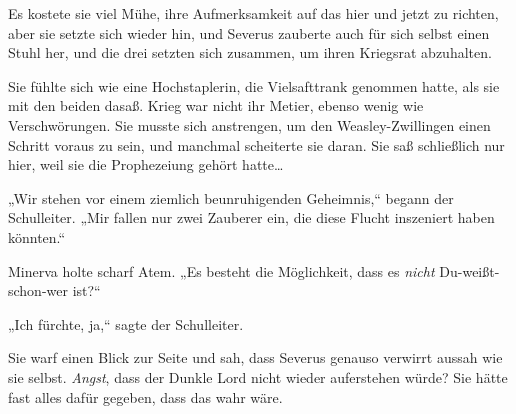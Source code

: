 Es kostete sie viel Mühe, ihre Aufmerksamkeit auf das hier und jetzt zu richten, aber sie setzte sich wieder hin, und Severus zauberte auch für sich selbst einen Stuhl her, und die drei setzten sich zusammen, um ihren Kriegsrat abzuhalten.

Sie fühlte sich wie eine Hochstaplerin, die Vielsafttrank genommen hatte, als sie mit den beiden dasaß. Krieg war nicht ihr Metier, ebenso wenig wie Verschwörungen. Sie musste sich anstrengen, um den Weasley-Zwillingen einen Schritt voraus zu sein, und manchmal scheiterte sie daran. Sie saß schließlich nur hier, weil sie die Prophezeiung gehört hatte…

„Wir stehen vor einem ziemlich beunruhigenden Geheimnis,“ begann der Schulleiter. „Mir fallen nur zwei Zauberer ein, die diese Flucht inszeniert haben könnten.“

Minerva holte scharf Atem. „Es besteht die Möglichkeit, dass es \emph{nicht} Du-weißt-schon-wer ist?“

„Ich fürchte, ja,“ sagte der Schulleiter.

Sie warf einen Blick zur Seite und sah, dass Severus genauso verwirrt aussah wie sie selbst. \emph{Angst}, dass der Dunkle Lord nicht wieder auferstehen würde? Sie hätte fast alles dafür gegeben, dass das wahr wäre.


